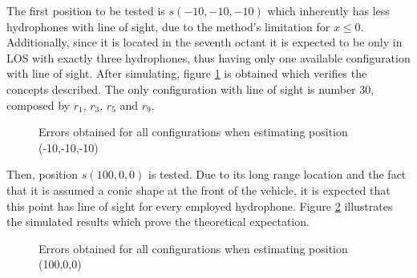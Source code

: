 The first position to be tested is $s(-10,-10,-10)$ which inherently has less hydrophones with line of sight, due to the method's limitation for $x \leq 0$. Additionally, since it is located in the seventh octant it is expected to be only in LOS with exactly three hydrophones, thus having only one available configuration with line of sight. After simulating, figure \ref{fig:errors-10-10-10} is obtained which verifies the concepts described. The only configuration with line of sight is number 30, composed by $r_1$, $r_3$, $r_5$ and $r_9$.

\begin{figure}[!htbp]
	\captionsetup{justification=centering,margin=2cm}
	\caption{Errors obtained for all configurations when estimating position (-10,-10,-10)}
	\label{fig:errors-10-10-10}
\end{figure}

Then, position $s(100,0,0)$ is tested. Due to its long range location and the fact that it is assumed a conic shape at the front of the vehicle, it is expected that this point has line of sight for every employed hydrophone. Figure \ref{fig:errors-100-0-0} illustrates the simulated results which prove the theoretical expectation.

\begin{figure}[!htbp]
	\captionsetup{justification=centering,margin=2cm}
	\caption{Errors obtained for all configurations when estimating position (100,0,0)}
	\label{fig:errors-100-0-0}
\end{figure}

